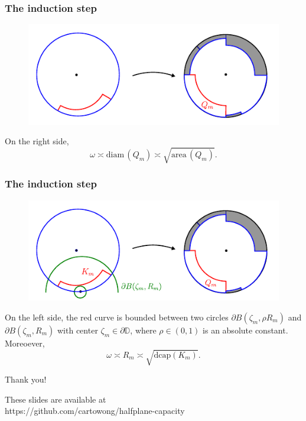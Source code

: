 \documentclass[xcolor=pdftex,dvipsnames,table]{beamer}
\newcommand{\bbD}{\mathbb{D}}
\newcommand{\go}{\omega}
\newcommand{\gz}{\zeta}
\newcommand{\area}{\text{area}\,}
\newcommand{\diam}{\text{diam}\,}
\newcommand{\dcap}{\text{dcap}}
\theoremstyle{definition}
\begin{document}
\begin{frame}
  \frametitle{The induction step}
  \begin{figure}
    \includegraphics[scale=1]{removeOneSquare_03.pdf}
  \end{figure}
  On the right side,
  \[
      \go \asymp \diam(Q_m) \asymp \sqrt{\area(Q_m)}.
  \]
\end{frame}

\begin{frame}
  \frametitle{The induction step}
  \begin{figure}
    \includegraphics[scale=1]{removeOneSquare_04.pdf}
  \end{figure}
  On the left side, the red curve is bounded between two circles $\partial B(\gz_m, \rho R_m)$ and $\partial B(\gz_m, R_m)$
  with center $\gz_m \in \partial \bbD$, where {\color{blue} $\rho \in (0,1)$ is an absolute constant}. Moreoever,
  \[
      \go \asymp R_m \asymp \sqrt{\dcap(K_m)}.
  \]
\end{frame}

\begin{frame}
  \begin{center}
    \huge{Thank you!}
  \end{center}
  \vspace{.2in}
  These slides are available at\\
  {\color{blue} https://github.com/cartowong/halfplane-capacity}  
\end{frame}
\end{document}
